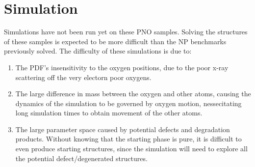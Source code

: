 \section{Simulation}
Simulations have not been run yet on these PNO samples.
Solving the structures of these samples is expected to be more difficult than the NP benchmarks previously solved.
The difficulty of these simulations is due to:
\begin{enumerate}
    \item The PDF's insensitivity to the oxygen positions, due to the poor x-ray scattering off the very electorn poor oxygens.
    \item The large difference in mass between the oxygen and other atoms, causing the dynamics of the simulation to be governed by oxygen motion, nessecitating long simulation times to obtain movement of the other atoms.
    \item The large parameter space caused by potential defects and degradation products.
    Without knowing that the starting phase is pure, it is difficult to even produce starting structures, since the simulation will need to explore all the potential defect/degenerated structures.
\end{enumerate}
